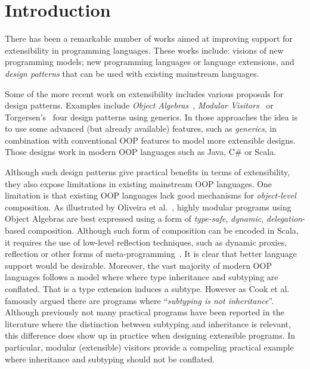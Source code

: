 \section{Introduction}


There has been a remarkable number of works aimed at improving support
for extensibility in programming languages. These works include:
visions of new programming models\cite{}; new programming languages or
language extensions\cite{}, and \emph{design patterns} that can be
used with existing mainstream languages.


Some of the more recent work on extensibility includes various
proposals for design patterns.  Examples include \emph{Object
  Algebras}~\cite{}, \emph{Modular Visitors}~\cite{} or
Torgersen's~\cite{} four design patterns using generics. In those
approaches the idea is to use some advanced (but already available)
features, such as \emph{generics}, in combination with conventional OOP
features to model more extensible designs. Those designs work in
modern OOP languages such as Java, C\# or Scala. 

Although such design patterns give practical benefits in terms of
extensibility, they also expose limitations in existing mainstream OOP
languages. One limitation is that existing OOP languages lack
good mechanisms for \emph{object-level} composition.  As illustrated
by Oliveira et al.~\cite{}, highly modular programs using Object
Algebras are best expressed using a form of \emph{type-safe},
\emph{dynamic}, \emph{delegation}-based composition. Although such
form of composition can be encoded in Scala, it requires the use of
low-level reflection techniques, such as dynamic proxies, reflection
or other forms of meta-programming~\cite{}. It is clear that better 
language support would be desirable. Moreover, the vast 
majority of modern OOP languages follows a model where where 
type inheritance and subtyping are conflated. That is a type extension 
induces a subtype. However as Cook et al.~\cite{} famously argued there 
are programs where ``\emph{subtyping is not inheritance}''. Although 
previously not many practical programs have been reported in the literature 
where the distinction between subtyping and inheritance is relevant, 
this difference does show up in practice when designing extensible 
programs. In particular, modular (extensible)  
visitors provide a compeling practical example where inheritance 
and subtyping should not be conflated.
 

